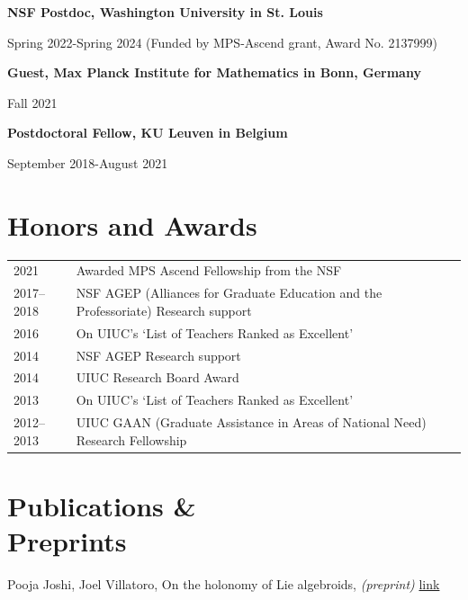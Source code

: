 \documentclass[margin,line,pifont,palatino,courier]{res}
\newenvironment{list1}{
  \begin{list}{\ding{113}}{%
      \setlength{\itemsep}{0in}
      \setlength{\parsep}{0in} \setlength{\parskip}{0in}
      \setlength{\topsep}{0in} \setlength{\partopsep}{0in}
      \setlength{\leftmargin}{0.17in}}}{\end{list}}
\begin{document}
\begin{resume}
{\bf NSF Postdoc, Washington University in St. Louis}\\
\vspace*{-.1in}
\begin{list1}
\item[] Spring 2022-Spring 2024 (Funded by MPS-Ascend grant, Award No. 2137999)
\end{list1}


{\bf Guest, Max Planck Institute for Mathematics in Bonn, Germany}\\
\vspace*{-.1in}
\begin{list1}
\item[] Fall 2021
\end{list1}

{\bf Postdoctoral Fellow, KU Leuven in Belgium}\\
\vspace*{-.1in}
\begin{list1} 
\item[] September 2018-August 2021
\end{list1}



\section{\sc Honors and Awards}

\begin{tabular}{@{}p{0.8in}p{4in}}
2021 & Awarded MPS Ascend Fellowship from the NSF \\
2017--2018 & NSF AGEP (Alliances for Graduate Education and the Professoriate) Research support\\
2016  & On UIUC's `List of Teachers Ranked as Excellent' \\
2014 & NSF AGEP Research support\\
2014       & UIUC Research Board Award\\
2013 & On UIUC's `List of Teachers Ranked as Excellent' \\
2012--2013 & UIUC GAAN (Graduate Assistance in Areas of National Need) Research Fellowship
\end{tabular}


\section{\sc Publications \&\\ Preprints}

Pooja Joshi, Joel Villatoro, On the holonomy of Lie algebroids, \textit{(preprint)} \href{https://arxiv.org/abs/2608.19399}{link}


\end{resume}
\end{document}
